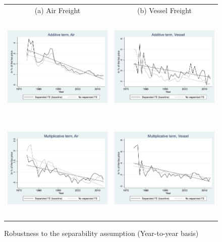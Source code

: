 \documentclass[a4paper,11pt]{article}
\begin{document}
\begin{figure}[htbp]
\caption{Robustness to the separability assumption (Year-to-year basis)}
\label{fig:robustesse_non_separe}
\begin{center}
\begin{tabular}{cc}
{\small (a) Air Freight} & {\small (b) Vessel Freight}\\
\includegraphics[width=2.5in, height=2in]{graph_robustesse_ns_mp_terme_A_air.pdf}
& \includegraphics[width=2.5in,height=2in]{graph_robustesse_ns_mp_terme_A_ves.pdf} \\
\includegraphics[width=2.5in, height=2in]{graph_robustesse_ns_mp_terme_I_air.pdf}
& \includegraphics[width=2.5in,height=2in]{graph_robustesse_ns_mp_terme_I_ves.pdf} \\

\end{tabular}
\end{center}
\end{figure}
\end{document}
